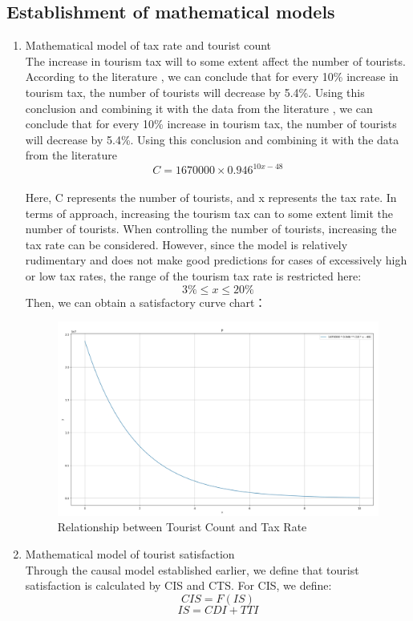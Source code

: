 \documentclass[12pt]{article}  %
\begin{document}
 \subsection{Establishment of mathematical models}
 \begin{enumerate}[(1)]
    \setlength{\parsep}{0ex} %
\setlength{\topsep}{2ex} %
\setlength{\itemsep}{1ex} %
\item Mathematical model of tax rate and tourist count\\
The increase in tourism tax will to some extent affect the number of tourists. According to the literature \cite{taxandtour}, we can conclude that for every 10\% increase in tourism tax, the number of tourists will decrease by 5.4\%. Using this conclusion and combining it with the data from the literature \cite{pop}, we can conclude that for every 10\% increase in tourism tax, the number of tourists will decrease by 5.4\%. Using this conclusion and combining it with the data from the literature \\
$$C=1670000 \times 0.946^{10x-48}$$\\
Here, C represents the number of tourists, and x represents the tax rate. In terms of approach, increasing the tourism tax can to some extent limit the number of tourists. When controlling the number of tourists, increasing the tax rate can be considered. However, since the model is relatively rudimentary and does not make good predictions for cases of excessively high or low tax rates, the range of the tourism tax rate is restricted here: $$3\% \leq x  \leq 20\%$$
Then, we can obtain a satisfactory curve chart：
\begin{figure}[H]  %
 
    \centering  %
    \includegraphics[width=1\textwidth]{model1.png} %
    \caption{Relationship between Tourist Count and Tax Rate} %
    \label{fig1}%
    \end{figure}
\item Mathematical model of tourist satisfaction\\
Through the causal model established earlier, we define that tourist satisfaction is calculated by CIS and CTS. For CIS, we define:
$$CIS=F(IS)$$
$$IS=CDI+TTI$$


\end{enumerate}
\end{document}
